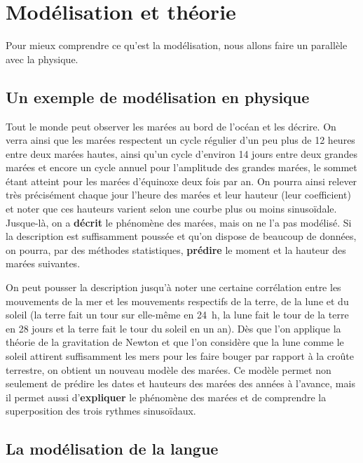\section{Modélisation et théorie}\label{sec:1.3.2}

Pour mieux comprendre ce qu’est la modélisation, nous allons faire un parallèle avec la physique.

\subsection{Un exemple de modélisation en physique}

Tout le monde peut observer les marées au bord de l’océan et les décrire. On verra ainsi que les marées respectent un cycle régulier d’un peu plus de 12 heures entre deux marées hautes, ainsi qu’un cycle d’environ 14 jours entre deux grandes marées et encore un cycle annuel pour l’amplitude des grandes marées, le sommet étant atteint pour les marées d’équinoxe deux fois par an. On pourra ainsi relever très précisément chaque jour l’heure des marées et leur hauteur (leur coefficient) et noter que ces hauteurs varient selon une courbe plus ou moins sinusoïdale. Jusque-là, on a \textbf{décrit} le phénomène des marées, mais on ne l’a pas modélisé. Si la description est suffisamment poussée et qu’on dispose de beaucoup de données, on pourra, par des méthodes statistiques, \textbf{prédire} le moment et la hauteur des marées suivantes.

On peut pousser la description jusqu’à noter une certaine corrélation entre les mouvements de la mer et les mouvements respectifs de la terre, de la lune et du soleil (la terre fait un tour sur elle-même en 24~h, la lune fait le tour de la terre en 28 jours et la terre fait le tour du soleil en un an). Dès que l’on applique la théorie de la gravitation de Newton et que l’on considère que la lune comme le soleil attirent suffisamment les mers pour les faire bouger par rapport à la croûte terrestre, on obtient un nouveau modèle des marées. Ce modèle permet non seulement de prédire les dates et hauteurs des marées des années à l’avance, mais il permet aussi d’\textbf{expliquer} le phénomène des marées et de comprendre la superposition des trois rythmes sinusoïdaux.

\subsection{La modélisation de la langue}


